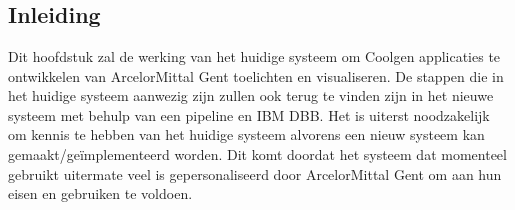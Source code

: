 
\chapter{}%
\label{ch:current system}

\section{Inleiding}
\label{sec:inleiding_currsys}
Dit hoofdstuk zal de werking van het huidige systeem om Coolgen applicaties te ontwikkelen van ArcelorMittal Gent toelichten en visualiseren. De stappen die in het huidige systeem aanwezig zijn zullen ook terug te vinden zijn in het nieuwe systeem met behulp van een pipeline en IBM DBB. Het is uiterst noodzakelijk om kennis te hebben van het huidige systeem alvorens een nieuw systeem kan gemaakt/geïmplementeerd worden. Dit komt doordat het systeem dat momenteel gebruikt uitermate veel is gepersonaliseerd door ArcelorMittal Gent om aan hun eisen en gebruiken te voldoen. 

